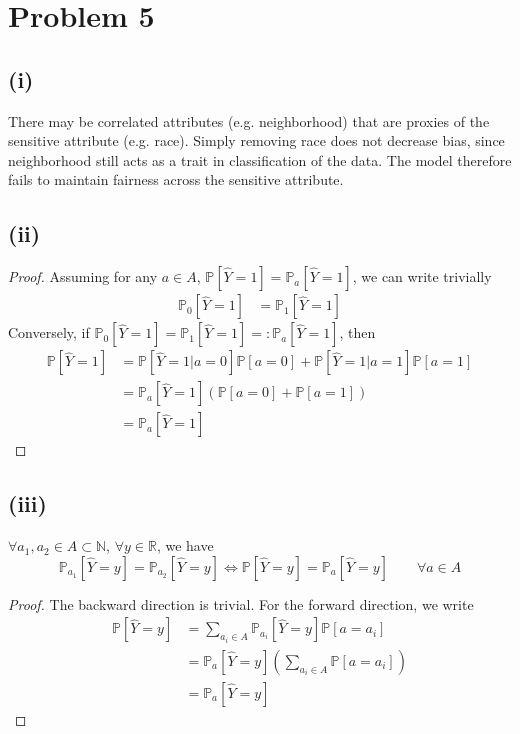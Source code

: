 \documentclass[twoside,11pt]{homework}
\begin{document}
\section*{Problem 5}
\subsection*{(i)}
	There may be correlated attributes (e.g. neighborhood) that are proxies of the sensitive attribute (e.g. race). 
	Simply removing race does not decrease bias, since neighborhood still acts as a trait in classification of the data. 
	The model therefore fails to maintain fairness across the sensitive attribute.
\subsection*{(ii)}  
	\begin{proof}
	Assuming for any $a\in A$, $\mathbb{P}[\hat{Y}=1]=\mathbb{P}_a[\hat{Y}=1]$, we can write trivially
	\begin{align*}
		\mathbb{P}_0[\hat{Y}=1]&=\mathbb{P}_1[\hat{Y}=1]
	\end{align*}
	Conversely, if $\mathbb{P}_0[\hat{Y}=1]=\mathbb{P}_1[\hat{Y}=1]=:\mathbb{P}_a[\hat{Y}=1]$, then 
	\begin{align*}
		\mathbb{P}[\hat{Y}=1] &= \mathbb{P}[\hat{Y}=1|a=0]\mathbb{P}[a=0]+\mathbb{P}[\hat{Y}=1|a=1]\mathbb{P}[a=1]\\
		&= \mathbb{P}_a[\hat{Y}=1] (\mathbb{P}[a=0]+\mathbb{P}[a=1])\\
		&= \mathbb{P}_a[\hat{Y}=1]
	\end{align*}
	\end{proof}
\subsection*{(iii)}  
	\begin{claim}
		$\forall a_1, a_2  \in A\subset \mathbb{N}$, $\forall y\in \mathbb{R}$, we have 
		$$\mathbb{P}_{a_1}[\hat{Y}=y] = \mathbb{P}_{a_2}[\hat{Y}=y] 
		\Longleftrightarrow \mathbb{P}[\hat{Y}=y] = \mathbb{P}_a[\hat{Y}=y] \qquad \forall a\in A$$
	\end{claim}
	\begin{proof}
		The backward direction is trivial. For the forward direction, we write
		\begin{align*}
			 \mathbb{P}[\hat{Y}=y] &= \sum_{a_i \in A} \mathbb{P}_{a_i}[\hat{Y}=y]\mathbb{P}[a=a_i] \\
 			 &=  \mathbb{P}_a[\hat{Y}=y] \left( \sum_{a_i\in A} \mathbb{P}[a=a_i] \right) \\
			 &=  \mathbb{P}_a[\hat{Y}=y] 
		\end{align*}
	\end{proof}
	
\end{document}
